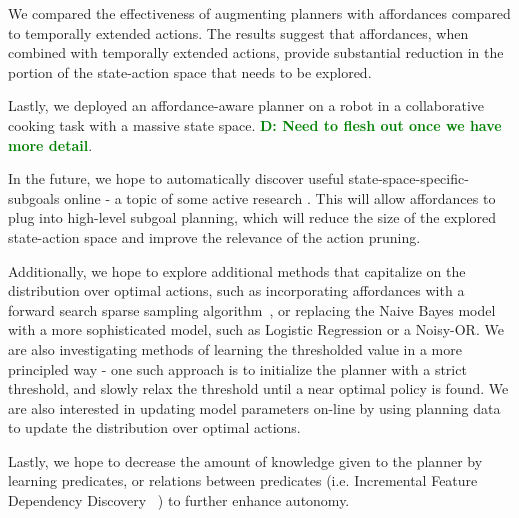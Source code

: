 \documentclass[conference]{IEEEtran}
\newcommand{\dnote}[1]{\textcolor{Green}{\textbf{D: #1}}}
\begin{document}
We compared the effectiveness of augmenting planners with affordances compared to 
temporally extended actions. The results suggest that affordances, when combined with 
temporally extended actions, provide substantial reduction in the portion of the state-action 
space that needs to be explored.

Lastly, we deployed an affordance-aware planner on a robot in a collaborative cooking task with a massive 
state space. \dnote{Need to flesh out once we have more detail}.

In the future, we hope to automatically discover useful state-space-specific-subgoals online 
- a topic of some active research \cite{Mcgovern01automaticdiscovery,Simsek:2005:IUS:1102351.1102454}.
This will allow affordances to plug into high-level subgoal planning, which will reduce the size of the 
explored state-action space and improve the relevance of the action pruning. 

Additionally, we hope to explore additional methods that capitalize on the distribution over optimal actions,
such as incorporating affordances with a forward search sparse sampling algorithm~\cite{walsh2010integrating},
or replacing the Naive Bayes model with a more sophisticated model, such as Logistic Regression or a Noisy-OR.
We are also investigating methods of learning the thresholded value in a more principled way - one such
approach is to initialize the planner with a strict threshold, and slowly relax the threshold until a near optimal
policy is found. We are also interested in updating model parameters on-line by using planning data to update
the distribution over optimal actions. 

Lastly, we hope to decrease the amount of knowledge given to the planner by learning predicates, or relations between predicates (i.e. Incremental Feature Dependency Discovery ~\cite{ICML2011Geramifard_473}) to further enhance autonomy.

{\small


}
\end{document}
